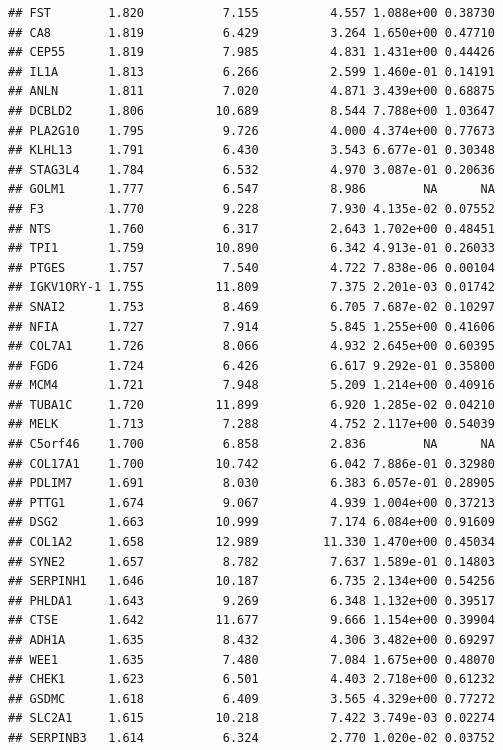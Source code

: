 \documentclass{article}\usepackage[]{graphicx}\usepackage[]{color}
\makeatletter
\newenvironment{kframe}{%
 \def\at@end@of@kframe{}%
 \ifinner\ifhmode%
  \def\at@end@of@kframe{\end{minipage}}%
  \begin{minipage}{\columnwidth}%
 \fi\fi%
 \def\FrameCommand##1{\hskip\@totalleftmargin \hskip-\fboxsep
 \colorbox{shadecolor}{##1}\hskip-\fboxsep
     \hskip-\linewidth \hskip-\@totalleftmargin \hskip\columnwidth}%
 \MakeFramed {\advance\hsize-\width
   \@totalleftmargin\z@ \linewidth\hsize
   \@setminipage}}%
 {\par\unskip\endMakeFramed%
 \at@end@of@kframe}
\newenvironment{knitrout}{}{} %
\makeatother
\begin{document}
\begin{knitrout}
\begin{kframe}
\begin{verbatim}
## FST        1.820           7.155          4.557 1.088e+00 0.38730
## CA8        1.819           6.429          3.264 1.650e+00 0.47710
## CEP55      1.819           7.985          4.831 1.431e+00 0.44426
## IL1A       1.813           6.266          2.599 1.460e-01 0.14191
## ANLN       1.811           7.020          4.871 3.439e+00 0.68875
## DCBLD2     1.806          10.689          8.544 7.788e+00 1.03647
## PLA2G10    1.795           9.726          4.000 4.374e+00 0.77673
## KLHL13     1.791           6.430          3.543 6.677e-01 0.30348
## STAG3L4    1.784           6.532          4.970 3.087e-01 0.20636
## GOLM1      1.777           6.547          8.986        NA      NA
## F3         1.770           9.228          7.930 4.135e-02 0.07552
## NTS        1.760           6.317          2.643 1.702e+00 0.48451
## TPI1       1.759          10.890          6.342 4.913e-01 0.26033
## PTGES      1.757           7.540          4.722 7.838e-06 0.00104
## IGKV1ORY-1 1.755          11.809          7.375 2.201e-03 0.01742
## SNAI2      1.753           8.469          6.705 7.687e-02 0.10297
## NFIA       1.727           7.914          5.845 1.255e+00 0.41606
## COL7A1     1.726           8.066          4.932 2.645e+00 0.60395
## FGD6       1.724           6.426          6.617 9.292e-01 0.35800
## MCM4       1.721           7.948          5.209 1.214e+00 0.40916
## TUBA1C     1.720          11.899          6.920 1.285e-02 0.04210
## MELK       1.713           7.288          4.752 2.117e+00 0.54039
## C5orf46    1.700           6.858          2.836        NA      NA
## COL17A1    1.700          10.742          6.042 7.886e-01 0.32980
## PDLIM7     1.691           8.030          6.383 6.057e-01 0.28905
## PTTG1      1.674           9.067          4.939 1.004e+00 0.37213
## DSG2       1.663          10.999          7.174 6.084e+00 0.91609
## COL1A2     1.658          12.989         11.330 1.470e+00 0.45034
## SYNE2      1.657           8.782          7.637 1.589e-01 0.14803
## SERPINH1   1.646          10.187          6.735 2.134e+00 0.54256
## PHLDA1     1.643           9.269          6.348 1.132e+00 0.39517
## CTSE       1.642          11.677          9.666 1.154e+00 0.39904
## ADH1A      1.635           8.432          4.306 3.482e+00 0.69297
## WEE1       1.635           7.480          7.084 1.675e+00 0.48070
## CHEK1      1.623           6.501          4.403 2.718e+00 0.61232
## GSDMC      1.618           6.409          3.565 4.329e+00 0.77272
## SLC2A1     1.615          10.218          7.422 3.749e-03 0.02274
## SERPINB3   1.614           6.324          2.770 1.020e-02 0.03752

\end{verbatim}
\end{kframe}
\end{knitrout}
\end{document}
